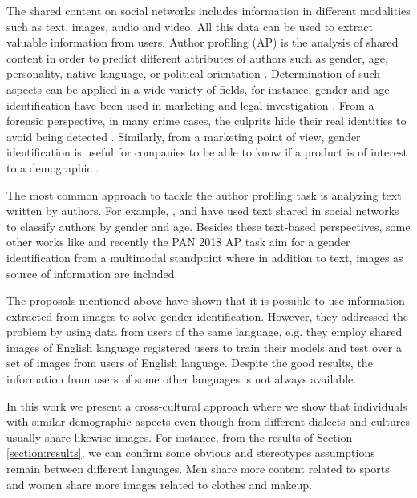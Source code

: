 \documentclass[runningheads]{llncs}
\begin{document}
The shared content on social networks includes information in different modalities such as text, images, audio and video.
All this data can be used to extract valuable information from users.
Author profiling (AP) is the analysis of shared content in order to predict different attributes of authors such as gender, age, personality, native language, or political orientation \cite{rangel_rosso_montes-y-gomez_potthast_stein}.
Determination of such aspects can be applied in a wide variety of fields, for instance, gender and age identification have been
used in marketing and legal investigation \cite{miller_dickinson_hu_2012}. From a forensic perspective, in many crime 
cases, the culprits hide their real identities to avoid being detected \cite{cheng_chandramouli_subbalakshmi_2011}. Similarly, from
a marketing point of view, gender identification is useful
for companies to be able to know if a product is of interest
to a demographic \cite{rangel2013use}.

The most common approach to tackle the author profiling task
is analyzing text written by authors. 
For example, \cite{cheng_chandramouli_subbalakshmi_2011}, \cite{FATIMA2017886} and \cite{gomez2016improving}
have used text shared in social networks to 
classify authors by gender and age.
Besides these text-based perspectives,
some other works like \cite{merler2015you} and 
recently the PAN 2018 AP task \cite{rangel_rosso_montes-y-gomez_potthast_stein}  aim
for a gender identification from a multimodal standpoint
where in addition to text, images as source of information
are included.

The proposals mentioned above have shown that it is possible to use information extracted from images to solve gender identification. However, they addressed the problem by using data from users of the same language, e.g. they employ shared images of English language registered users to train their models and test over a set of images from users of English language. Despite the good results, the information from users of some other languages is not always available. 

In this work we present a cross-cultural approach where we show that individuals with similar demographic aspects even though from different dialects and cultures usually share likewise images.
For instance, from the results of Section \ref{section:results},
we can confirm some obvious and stereotypes assumptions remain
between different languages. Men share more content related to sports and women share more images related to clothes and makeup.
\end{document}
